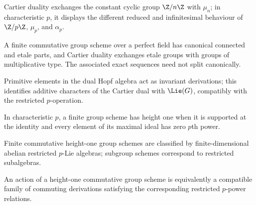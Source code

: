 \begin{example}
\label{mumford3-cartier-examples}
Cartier duality exchanges the constant cyclic group $\Z/n\Z$ with $\mu_n$;
in characteristic $p$, it displays the different reduced and infinitesimal
behaviour of $\Z/p\Z$, $\mu_p$, and $\alpha_p$.
\notready
\end{example}

\begin{theorem}
\label{mumford3-local-reduced-decomposition}
A finite commutative group scheme over a perfect field has canonical connected
and etale parts, and Cartier duality exchanges etale groups with groups of
multiplicative type.  The associated exact sequences need not split canonically.
\notready
\end{theorem}

\begin{proposition}
\label{mumford3-primitive-elements-lie}
Primitive elements in the dual Hopf algebra act as invariant derivations; this
identifies additive characters of the Cartier dual with $\Lie(G)$, compatibly
with the restricted $p$-operation.
\notready
\end{proposition}

\begin{definition}
\label{mumford3-height-one-group}
In characteristic $p$, a finite group scheme has height one when it is supported
at the identity and every element of its maximal ideal has zero $p$th power.
\notready
\end{definition}

\begin{theorem}
\label{mumford3-height-one-equivalence}
Finite commutative height-one group schemes are classified by finite-dimensional
abelian restricted $p$-Lie algebras; subgroup schemes correspond to restricted
subalgebras.
\notready
\end{theorem}

\begin{corollary}
\label{mumford3-height-one-action}
An action of a height-one commutative group scheme is equivalently a compatible
family of commuting derivations satisfying the corresponding restricted
$p$-power relations.
\notready
\end{corollary}

